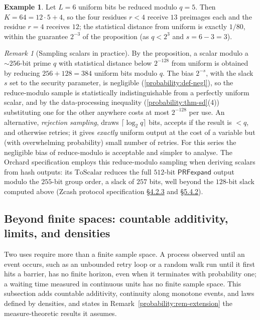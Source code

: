 \documentclass[11pt,a4paper]{article}
\theoremstyle{definition}
\newtheorem{example}[theorem]{Example}
\theoremstyle{remark}
\newtheorem{remark}[theorem]{Remark}
\providecommand{\ceil}[1]{\lceil #1 \rceil}
\begin{document}
\begin{example}\label{probability:exp-modbias}
Let \(L = 6\) uniform bits be reduced modulo \(q = 5\). Then
\(K = 64 = 12 \cdot 5 + 4\), so the four residues \(r < 4\) receive
\(13\) preimages each and the residue \(r = 4\) receives \(12\); the
statistical distance from uniform is exactly \(1/80\),
within the guarantee \(2^{-3}\) of the proposition (as \(q < 2^3\)
and \(s = 6 - 3 = 3\)).
\end{example}

\begin{remark}[Sampling scalars in practice]\label{probability:rem-modbias}
By the proposition, a scalar modulo a \({\sim}256\)-bit prime \(q\)
with statistical distance below \(2^{-128}\) from uniform is obtained
by reducing \(256 + 128 = 384\) uniform bits modulo \(q\). The bias
\(2^{-s}\), with the slack \(s\) set to the security
parameter, is negligible (\cref{probability:def-negl}), so the
reduce-modulo sample is statistically indistinguishable from a
perfectly uniform scalar, and by the data-processing inequality
(\cref{probability:thm-sd}(4)) substituting one for the other
anywhere costs at most \(2^{-128}\) per use. An alternative,
\emph{rejection sampling}, draws \(\ceil{\log_2 q}\) bits, accepts if
the result is \(< q\), and otherwise retries; it gives \emph{exactly}
uniform output at the cost of a variable but (with overwhelming
probability) small number of retries. For this series the negligible
bias of reduce-modulo is acceptable and simpler to analyse. The Orchard
specification employs this reduce-modulo sampling when
deriving scalars from hash outputs: its \(\mathrm{ToScalar}\) reduces
the full \(512\)-bit \(\mathsf{PRFexpand}\) output modulo the
\(255\)-bit group order, a slack of \(257\) bits, well
beyond the \(128\)-bit slack computed above (Zcash protocol specification
\href{https://zips.z.cash/protocol/protocol.pdf\#orchardkeycomponents}{\S4.2.3}
and \href{https://zips.z.cash/protocol/protocol.pdf\#concreteprfs}{\S5.4.2}).
\end{remark}

\subsection{Beyond finite spaces: countable additivity, limits, and
densities}\label{probability:sub-beyond}

Two uses require more than a finite sample space. A process observed
until an event occurs, such as an unbounded retry loop or a random walk
run until it first hits a barrier, has no finite horizon, even when it
terminates with probability one; a waiting time measured in continuous
units has no finite sample space. This subsection adds countable
additivity, continuity along monotone events, and laws defined by
densities, and states in Remark~\ref{probability:rem-extension} the
measure-theoretic results it assumes.
\end{document}
